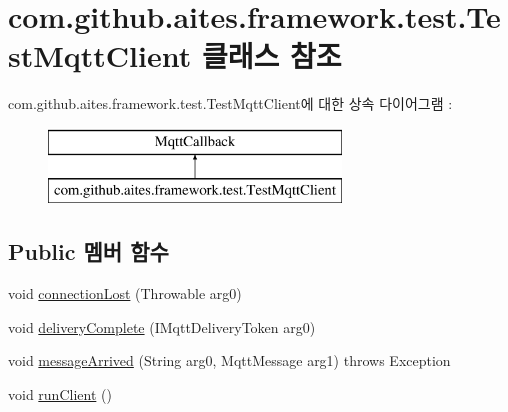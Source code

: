 \hypertarget{classcom_1_1github_1_1aites_1_1framework_1_1test_1_1_test_mqtt_client}{}\section{com.\+github.\+aites.\+framework.\+test.\+Test\+Mqtt\+Client 클래스 참조}
\label{classcom_1_1github_1_1aites_1_1framework_1_1test_1_1_test_mqtt_client}
com.\+github.\+aites.\+framework.\+test.\+Test\+Mqtt\+Client에 대한 상속 다이어그램 \+: \begin{figure}[H]
\begin{center}
\leavevmode
\includegraphics[height=2.000000cm]{classcom_1_1github_1_1aites_1_1framework_1_1test_1_1_test_mqtt_client}
\end{center}
\end{figure}
\subsection*{Public 멤버 함수}
\begin{DoxyCompactItemize}
\item 
void \mbox{\hyperlink{classcom_1_1github_1_1aites_1_1framework_1_1test_1_1_test_mqtt_client_a55caf2fc4e06f07ff8c8135cfaa2c9d6}{connection\+Lost}} (Throwable arg0)
\item 
void \mbox{\hyperlink{classcom_1_1github_1_1aites_1_1framework_1_1test_1_1_test_mqtt_client_ad4dd186d241920c8081cec151a829a1f}{delivery\+Complete}} (I\+Mqtt\+Delivery\+Token arg0)
\item 
void \mbox{\hyperlink{classcom_1_1github_1_1aites_1_1framework_1_1test_1_1_test_mqtt_client_aeadce4b1f4fa02787104af70185ead2c}{message\+Arrived}} (String arg0, Mqtt\+Message arg1)  throws Exception 
\item 
void \mbox{\hyperlink{classcom_1_1github_1_1aites_1_1framework_1_1test_1_1_test_mqtt_client_a65374070eb74dbee6056bf71528978ad}{run\+Client}} ()
\end{DoxyCompactItemize}
